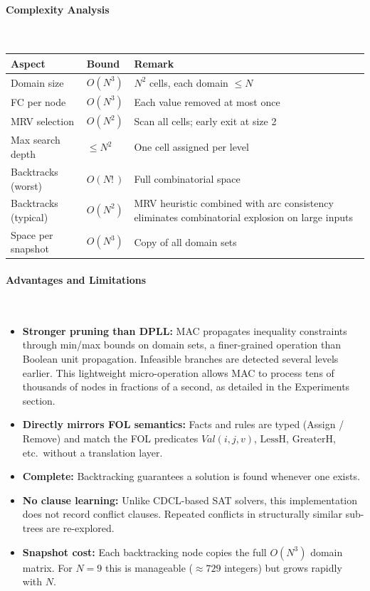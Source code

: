 \paragraph{Complexity Analysis}~

\begin{center}
\begin{tabular}{llp{5.5cm}}
\hline
\textbf{Aspect} & \textbf{Bound} & \textbf{Remark} \\
\hline
Domain size & $O(N^3)$ & $N^2$ cells, each domain $\leq N$ \\
FC per node & $O(N^3)$ & Each value removed at most once \\
MRV selection & $O(N^2)$ & Scan all cells; early exit at size 2 \\
Max search depth & $\leq N^2$ & One cell assigned per level \\
Backtracks (worst) & $O(N! \,)$ & Full combinatorial space \\
Backtracks (typical) & $O(N^2)$ & MRV heuristic combined with arc consistency eliminates combinatorial explosion on large inputs \\
Space per snapshot & $O(N^3)$ & Copy of all domain sets \\
\hline
\end{tabular}
\end{center}

\paragraph{Advantages and Limitations}~
\begin{itemize}
    \item \textbf{Stronger pruning than DPLL:} MAC propagates inequality
    constraints through min/max bounds on domain sets, a finer-grained
    operation than Boolean unit propagation. Infeasible branches are
    detected several levels earlier. This lightweight micro-operation 
    allows MAC to process tens of thousands of nodes in fractions of 
    a second, as detailed in the Experiments section.

    \item \textbf{Directly mirrors FOL semantics:} Facts and rules are typed
    (Assign / Remove) and match the FOL predicates $Val(i,j,v)$,
    $\text{LessH}$, $\text{GreaterH}$, etc.\ without a translation layer.

    \item \textbf{Complete:} Backtracking guarantees a solution is found
    whenever one exists.

    \item \textbf{No clause learning:} Unlike CDCL-based SAT solvers, this
    implementation does not record conflict clauses.  Repeated conflicts in
    structurally similar sub-trees are re-explored.

    \item \textbf{Snapshot cost:} Each backtracking node copies the full
    $O(N^3)$ domain matrix.  For $N = 9$ this is manageable ($\approx 729$
    integers) but grows rapidly with $N$.
\end{itemize}

